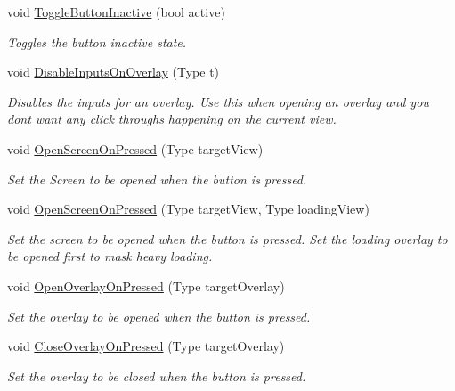 \begin{DoxyCompactItemize}
void \hyperlink{class_scaffolding_1_1_scaffolding_button_aae1c0c4bf8e05652482aa08e5074a146}{Toggle\-Button\-Inactive} (bool active)
\begin{DoxyCompactList}\small\item\em Toggles the button inactive state. \end{DoxyCompactList}\item 
void \hyperlink{class_scaffolding_1_1_scaffolding_button_a46d64b651a64a4bffbe23ccba30eb62b}{Disable\-Inputs\-On\-Overlay} (Type t)
\begin{DoxyCompactList}\small\item\em Disables the inputs for an overlay. Use this when opening an overlay and you dont want any click throughs happening on the current view. \end{DoxyCompactList}\item 
void \hyperlink{class_scaffolding_1_1_scaffolding_button_a58b903748ef8c771beaf4ef2549d6e3a}{Open\-Screen\-On\-Pressed} (Type target\-View)
\begin{DoxyCompactList}\small\item\em Set the Screen to be opened when the button is pressed. \end{DoxyCompactList}\item 
void \hyperlink{class_scaffolding_1_1_scaffolding_button_acf69a55f5537c91b3ddb251054c5b00e}{Open\-Screen\-On\-Pressed} (Type target\-View, Type loading\-View)
\begin{DoxyCompactList}\small\item\em Set the screen to be opened when the button is pressed. Set the loading overlay to be opened first to mask heavy loading. \end{DoxyCompactList}\item 
void \hyperlink{class_scaffolding_1_1_scaffolding_button_a6a88c00f8269467d03e6809fa10735bd}{Open\-Overlay\-On\-Pressed} (Type target\-Overlay)
\begin{DoxyCompactList}\small\item\em Set the overlay to be opened when the button is pressed. \end{DoxyCompactList}\item 
void \hyperlink{class_scaffolding_1_1_scaffolding_button_ad0f4de72aa3f1d16675ab391a5cc7fac}{Close\-Overlay\-On\-Pressed} (Type target\-Overlay)
\begin{DoxyCompactList}\small\item\em Set the overlay to be closed when the button is pressed. \end{DoxyCompactList}\item 

\end{DoxyCompactItemize}
